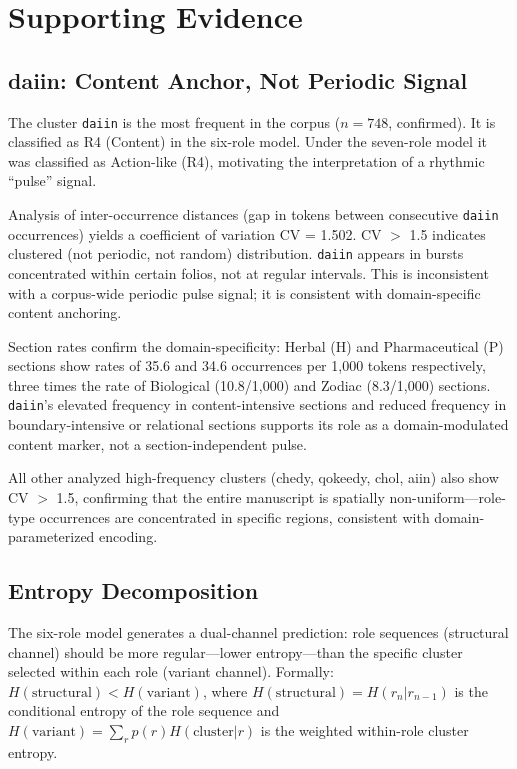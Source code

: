 \documentclass[11pt,a4paper,twocolumn]{article}
\begin{document}
\section{Supporting Evidence}
\label{sec:supporting}

\subsection{daiin: Content Anchor, Not Periodic Signal}
\label{sec:daiin}

The cluster \texttt{daiin} is the most frequent in the corpus ($n = 748$, confirmed). It is classified as R4 (Content) in the six-role model. Under the seven-role model it was classified as Action-like (R4), motivating the interpretation of a rhythmic ``pulse'' signal.

Analysis of inter-occurrence distances (gap in tokens between consecutive \texttt{daiin} occurrences) yields a coefficient of variation CV = 1.502. CV $>$ 1.5 indicates clustered (not periodic, not random) distribution. \texttt{daiin} appears in bursts concentrated within certain folios, not at regular intervals. This is inconsistent with a corpus-wide periodic pulse signal; it is consistent with domain-specific content anchoring.

Section rates confirm the domain-specificity: Herbal (H) and Pharmaceutical (P) sections show rates of 35.6 and 34.6 occurrences per 1,000 tokens respectively, three times the rate of Biological (10.8/1,000) and Zodiac (8.3/1,000) sections. \texttt{daiin}'s elevated frequency in content-intensive sections and reduced frequency in boundary-intensive or relational sections supports its role as a domain-modulated content marker, not a section-independent pulse.

All other analyzed high-frequency clusters (chedy, qokeedy, chol, aiin) also show CV $>$ 1.5, confirming that the entire manuscript is spatially non-uniform---role-type occurrences are concentrated in specific regions, consistent with domain-parameterized encoding.

\subsection{Entropy Decomposition}
\label{sec:entropy}

The six-role model generates a dual-channel prediction: role sequences (structural channel) should be more regular---lower entropy---than the specific cluster selected within each role (variant channel). Formally: $H(\text{structural}) < H(\text{variant})$, where $H(\text{structural}) = H(r_n | r_{n-1})$ is the conditional entropy of the role sequence and $H(\text{variant}) = \sum_r p(r) H(\text{cluster} | r)$ is the weighted within-role cluster entropy.
\end{document}
